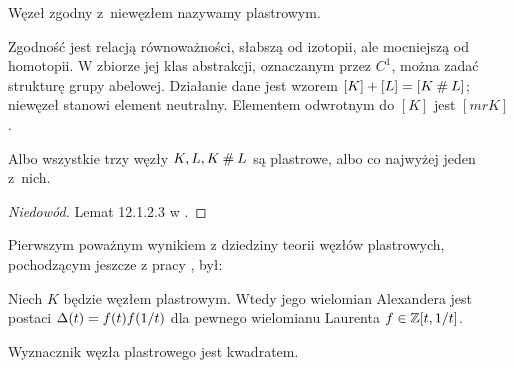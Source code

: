 \begin{definition}
    Węzeł zgodny z~niewęzłem nazywamy plastrowym.
\end{definition}

Zgodność jest relacją równoważności, słabszą od izotopii, ale mocniejszą od homotopii.
W zbiorze jej klas abstrakcji, oznaczanym przez $C^1$, można zadać strukturę grupy abelowej.
Działanie dane jest wzorem $[K] + [L] = [K \mathbin{\#} L]$; niewęzeł stanowi element neutralny.
Elementem odwrotnym do $[K]$ jest $[mrK]$.


\begin{proposition}
    Albo wszystkie trzy węzły $K, L, K \mathbin{\#} L$ są plastrowe, albo co najwyżej jeden z~nich.
\end{proposition}

\begin{proof}[Niedowód]
    Lemat 12.1.2.3 w \cite{kawauchi96}.
\end{proof}

Pierwszym poważnym wynikiem z dziedziny teorii węzłów plastrowych, pochodzącym jeszcze z pracy \cite{fox66}, był:

\begin{proposition}
    Niech $K$ będzie węzłem plastrowym.
    Wtedy jego wielomian Alexandera jest postaci $\Delta(t) = f(t) f(1/t)$ dla pewnego wielomianu Laurenta $f \in \mathbb Z[t, 1/t]$.
\end{proposition}

\begin{corollary}
    Wyznacznik węzła plastrowego jest kwadratem.
\end{corollary}

